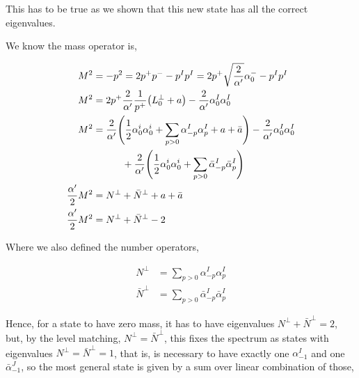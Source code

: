 This has to be true as we shown that this new state has all the correct eigenvalues.

We know the mass operator is,

\begin{align*}
    M^2&=-p^2=2p^+p^--p^Ip^I=2p^+\sqrt{\frac{2}{\alpha'}}\alpha_0^--p^Ip^I\\
    M^2&=2p^+\frac{2}{\alpha'}\frac{1}{p^+}\qty(L^\perp_0+a)-\frac{2}{\alpha'}\alpha_0^I\alpha_0^I\\
    M^2&=\frac{2}{\alpha'}\qty(\frac12\alpha_0^i\alpha_0^i+\sum\limits_{p> 0}\alpha^I_{-p}\alpha^I_{p}+a+\bar a)-\frac{2}{\alpha'}\alpha_0^I\alpha_0^I\\
    &\quad\quad\quad+\frac{2}{\alpha'}\qty(\frac12\alpha_0^i\alpha_0^i+\sum\limits_{p> 0}{\bar\alpha}^I_{-p}{\bar\alpha}^I_{p})\\
    \frac{\alpha'}{2}M^2&=N^\perp+{\bar N}^\perp+a+\bar a\\
    \frac{\alpha'}{2}M^2&=N^\perp+{\bar N}^\perp-2
\end{align*}

Where we also defined the number operators,

\begin{align*}
    N^\perp&=\sum\limits_{p> 0}\alpha^I_{-p}\alpha^I_{p}\\
    {\bar N}^\perp&=\sum\limits_{p> 0}{\bar\alpha}^I_{-p}{\bar\alpha}^I_{p}
\end{align*}

Hence, for a state to have zero mass, it has to have eigenvalues $N^\perp+{\bar N}^\perp=2$, but, by the level matching, $N^\perp={\bar N}^\perp$, 
this fixes the spectrum as states with eigenvalues $N^\perp={\bar N}^\perp=1$, that is, is necessary to have exactly one $\alpha^I_{-1}$ and one 
${\bar \alpha}_{-1}^J$, so the most general state is given by a sum over linear combination of those,

